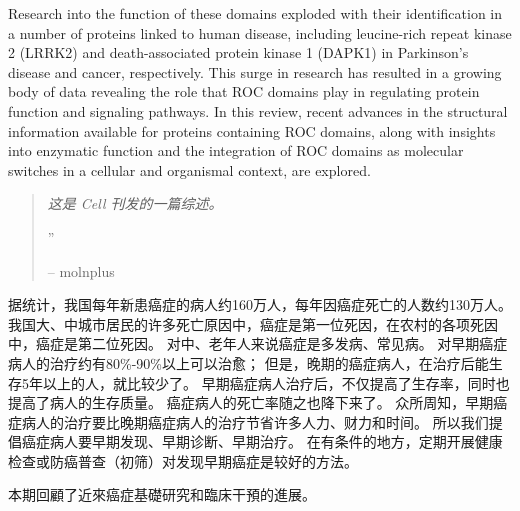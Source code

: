 \documentclass[10pt,a4paper]{article}
\newcommand{\NewsItem}[1]{ %
\usefont{T1}{fvs}{n}{n} %
\vspace{24pt}\large #1\vspace{3pt} %
\par \normalsize \normalfont}
\newcommand{\NewsAuthor}[1]{ %
\hfill by \textsc{#1} \vspace{20pt} %
\par \normalfont}
\begin{document}
\begin{multicols}{2}
Research into the function of these domains exploded with their identification in a number of proteins linked to human disease, including leucine-rich repeat kinase 2 (LRRK2) and death-associated protein kinase 1 (DAPK1) in Parkinson's disease and cancer, respectively.
This surge in research has resulted in a growing body of data revealing the role that ROC domains play in regulating protein function and signaling pathways.
In this review, recent advances in the structural information available for proteins containing ROC domains, along with insights into enzymatic function and the integration of ROC domains as molecular switches in a cellular and organismal context, are explored.\cite{CivDihLew1406}

\begin{quotation}

\noindent\normalsize\textit{这是 Cell 刊发的一篇综述。}

\hfill{\Huge''}

\hfill-- molnplus
\end{quotation}



% 
% 
% 


\NewsItem{{\color{hugored}{討論與總結}}}
据统计，我国每年新患癌症的病人约160万人，每年因癌症死亡的人数约130万人。
我国大、中城市居民的许多死亡原因中，癌症是第一位死因，在农村的各项死因中，癌症是第二位死因。
对中、老年人来说癌症是多发病、常见病。
对早期癌症病人的治疗约有80\%-90\%以上可以治愈；
但是，晚期的癌症病人，在治疗后能生存5年以上的人，就比较少了。
早期癌症病人治疗后，不仅提高了生存率，同时也提高了病人的生存质量。
癌症病人的死亡率随之也降下来了。
众所周知，早期癌症病人的治疗要比晚期癌症病人的治疗节省许多人力、财力和时间。
所以我们提倡癌症病人要早期发现、早期诊断、早期治疗。
在有条件的地方，定期开展健康检查或防癌普查（初筛）对发现早期癌症是较好的方法。

本期回顧了近來癌症基礎研究和臨床干預的進展。


\end{multicols}
\end{document}
